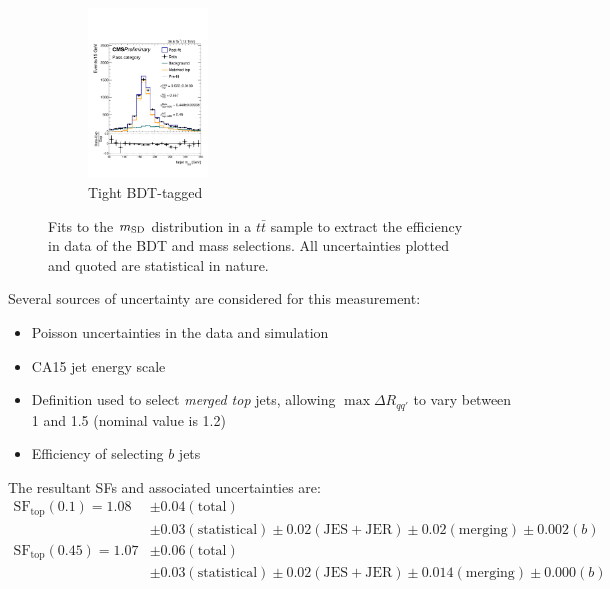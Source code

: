 \begin{figure}[]
\begin{center}
\begin{subfigure}[t]{\textwidth}
\begin{center}
            \includegraphics[width=0.35\textwidth]{figures/toptagging/sf/tight_pass.pdf}
            \caption{Tight BDT-tagged}
    \end{center}
        \end{subfigure}
        \caption{Fits to the $m_{\mathrm{SD}}$ distribution in a $t\bar{t}$ sample to extract the efficiency in data of the BDT and mass selections.
                 All uncertainties plotted and quoted are statistical in nature.}
        \label{fig:jets:sffits}
    \end{center}
\end{figure}

Several sources of uncertainty are considered for this measurement:
\begin{itemize}
    \setlength\itemsep{1pt}
    \item Poisson uncertainties in the data and simulation 
    \item CA15 jet energy scale
    \item Definition used to select \emph{merged top} jets, allowing $\max \Delta R_{qq'}$ to vary between 1 and 1.5 (nominal value is 1.2)
    \item Efficiency of selecting $b$ jets
\end{itemize}
The resultant SFs and associated uncertainties are:
\begin{align}
    \mathrm{SF}_\mathrm{top}(0.1) = 1.08 & \pm 0.04 (\mathrm{total}) \nonumber \\ 
                                         & \pm 0.03 (\mathrm{statistical}) \pm 0.02 (\mathrm{JES+JER}) \pm 0.02 (\mathrm{merging}) \pm 0.002 (b) \nonumber \\ 
    \mathrm{SF}_\mathrm{top}(0.45) = 1.07 & \pm 0.06 (\mathrm{total}) \nonumber \\ 
                                         & \pm 0.03 (\mathrm{statistical}) \pm 0.02 (\mathrm{JES+JER}) \pm 0.014 (\mathrm{merging}) \pm 0.000 (b) 
\end{align}

